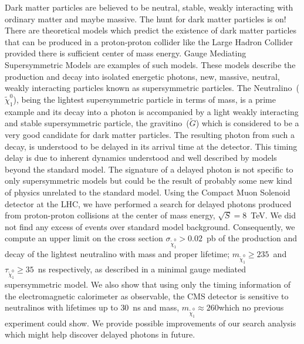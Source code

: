 
Dark matter particles are believed to be neutral, stable, weakly interacting with ordinary matter and maybe massive. The hunt for dark matter particles is on! There are theoretical models which predict the  existence of dark matter particles that can be produced in a proton-proton collider like the Large Hadron Collider provided there is sufficient center of mass energy. Gauge Mediating Supersymmetric Models are examples of such models. These models describe the production and decay into isolated energetic photons, new, massive, neutral, weakly interacting particles known as supersymmetric particles. The Neutralino~($\tilde{\chi}^{0}_{1}$), being the lightest supersymmetric particle in terms of mass, is a prime example and its decay into a photon is accompanied by a light weakly interacting and stable supersymmetric particle, the gravitino~($\tilde{G}$) which is considered to be a very good candidate for dark matter particles. The resulting photon from such a decay, is understood to be delayed in its arrival time at the detector. This timing delay is due to inherent dynamics understood and well described by models beyond the standard model. The signature of a delayed photon is not specific to only supersymmetric models but could be the result of probably some new kind of physics unrelated to the standard model. Using the Compact Muon Solenoid detector at the LHC, we have performed a search for delayed photons produced from proton-proton collisions at the center of mass energy, $\sqrt{S} = 8$~TeV. We did not find any excess of events over standard model background. Consequently, we compute an upper limit on the cross section $\sigma_{\tilde{\chi}^{0}_{1}} > 0.02$~pb of the production and decay of the lightest neutralino with  mass and proper lifetime; $m_{\tilde{\chi}^{0}_{1}} \geq 235$~\GeVcc and $\tau_{\tilde{\chi}^{0}_{1}} \ge 35$~ns respectively, as described in a minimal gauge mediated supersymmetric model. We also show that using only the timing information of the electromagnetic calorimeter as observable, the  CMS detector is sensitive to neutralinos with lifetimes up to $30$~ns and mass, $m_{\tilde{\chi}^{0}_{1}} \approx 260$\GeVcc which no previous experiment could show. We provide possible improvements  of our search analysis which might help discover delayed photons in future.